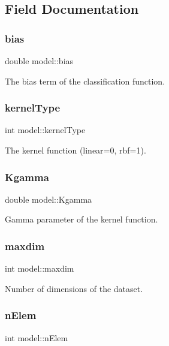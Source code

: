 \subsection{Field Documentation}
\hypertarget{structmodel_a9aef7cc709fca4e03a021623ce6c7ae6}{}\label{structmodel_a9aef7cc709fca4e03a021623ce6c7ae6} 
\subsubsection{\texorpdfstring{bias}{bias}}
{\ttfamily double model\+::bias}

The bias term of the classification function. \hypertarget{structmodel_aaff8ca8579bd888fcfeca1c682618be9}{}\label{structmodel_aaff8ca8579bd888fcfeca1c682618be9} 
\subsubsection{\texorpdfstring{kernel\+Type}{kernelType}}
{\ttfamily int model\+::kernel\+Type}

The kernel function (linear=0, rbf=1). \hypertarget{structmodel_ac5c18eca6ad32bc6da1f2a923965e66c}{}\label{structmodel_ac5c18eca6ad32bc6da1f2a923965e66c} 
\subsubsection{\texorpdfstring{Kgamma}{Kgamma}}
{\ttfamily double model\+::\+Kgamma}

Gamma parameter of the kernel function. \hypertarget{structmodel_ac6ba8c1bc138143114cd331583f41387}{}\label{structmodel_ac6ba8c1bc138143114cd331583f41387} 
\subsubsection{\texorpdfstring{maxdim}{maxdim}}
{\ttfamily int model\+::maxdim}

Number of dimensions of the dataset. \hypertarget{structmodel_a4877089d41daf2186482e0e6f900d65f}{}\label{structmodel_a4877089d41daf2186482e0e6f900d65f} 
\subsubsection{\texorpdfstring{n\+Elem}{nElem}}
{\ttfamily int model\+::n\+Elem}

